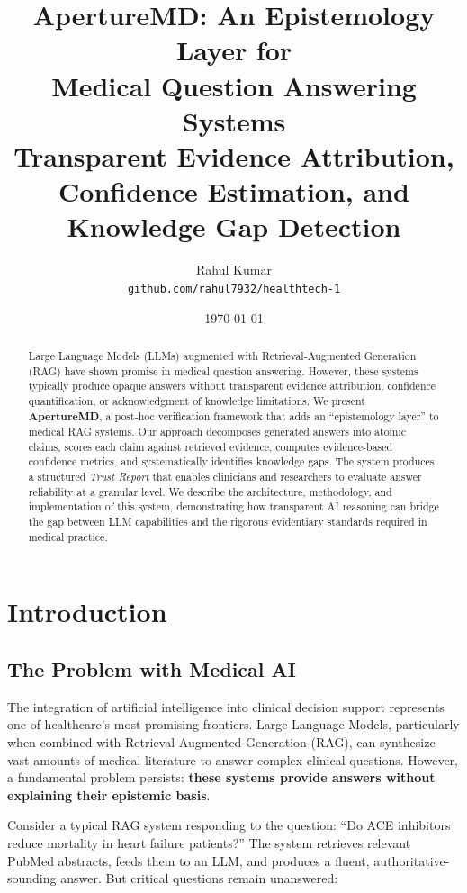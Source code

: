 \documentclass[11pt,a4paper]{article}
\title{
    \vspace{-1cm}
    \textbf{ApertureMD: An Epistemology Layer for \\Medical Question Answering Systems}\\[0.5em]
    \large Transparent Evidence Attribution, Confidence Estimation, and Knowledge Gap Detection
}
\author{
    Rahul Kumar\\
    \texttt{github.com/rahul7932/healthtech-1}
}
\date{\today}
\begin{document}
\maketitle

\begin{abstract}
Large Language Models (LLMs) augmented with Retrieval-Augmented Generation (RAG) have shown promise in medical question answering. However, these systems typically produce opaque answers without transparent evidence attribution, confidence quantification, or acknowledgment of knowledge limitations. We present \textbf{ApertureMD}, a post-hoc verification framework that adds an ``epistemology layer'' to medical RAG systems. Our approach decomposes generated answers into atomic claims, scores each claim against retrieved evidence, computes evidence-based confidence metrics, and systematically identifies knowledge gaps. The system produces a structured \textit{Trust Report} that enables clinicians and researchers to evaluate answer reliability at a granular level. We describe the architecture, methodology, and implementation of this system, demonstrating how transparent AI reasoning can bridge the gap between LLM capabilities and the rigorous evidentiary standards required in medical practice.
\end{abstract}

\section{Introduction}

\subsection{The Problem with Medical AI}

The integration of artificial intelligence into clinical decision support represents one of healthcare's most promising frontiers. Large Language Models, particularly when combined with Retrieval-Augmented Generation (RAG), can synthesize vast amounts of medical literature to answer complex clinical questions. However, a fundamental problem persists: \textbf{these systems provide answers without explaining their epistemic basis}.

Consider a typical RAG system responding to the question: ``Do ACE inhibitors reduce mortality in heart failure patients?'' The system retrieves relevant PubMed abstracts, feeds them to an LLM, and produces a fluent, authoritative-sounding answer. But critical questions remain unanswered:
\end{document}
